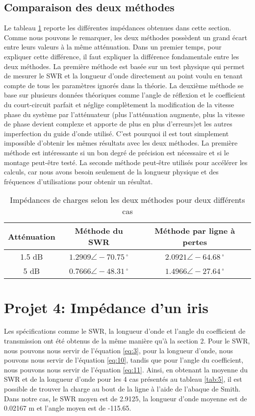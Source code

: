 \subsection{Comparaison des deux méthodes}
Le tableau \ref{tab:4} reporte les différentes impédances obtenues dans cette section. Comme nous pouvons le remarquer, les deux méthodes possèdent un grand écart entre leurs valeurs à la même atténuation. Dans un premier temps, pour expliquer cette différence, il faut expliquer la différence fondamentale entre les deux méthodes. La première méthode est basée sur un test physique qui permet de mesurer le SWR et la longueur d'onde directement au point voulu en tenant compte de tous les paramètres ignorés dans la théorie. La deuxième méthode se base sur plusieurs données théoriques comme l'angle de réflexion et le coefficient du court-circuit parfait et néglige complètement la modification de la vitesse phase du système par l'atténuateur (plus l'atténuation augmente, plus la vitesse de phase devient complexe et apporte de plus en plus d'erreurs)et les autres imperfection du guide d'onde utilisé. C'est pourquoi il est tout simplement impossible d'obtenir les mêmes résultats avec les deux méthodes. La première méthode est intéressante si un bon degré de précision est nécessaire et si le montage peut-être testé. La seconde méthode peut-être utilisés pour accélérer les calculs, car nous avons besoin seulement de la longueur physique et des fréquences d'utilisations pour obtenir un résultat.

  \begin{table}[htbp]
    \centering
    \begin{tabular}{|c||c|c|} \hline
    Atténuation & Méthode du SWR & Méthode par ligne à pertes \\ \hline  \hline
    1.5 dB & $1.2909 \angle -70.75\,^{\circ}$ & $2.0921 \angle -64.68\,^{\circ}$ \\
    5 dB   & $0.7666 \angle -48.31\,^{\circ}$ & $1.4966 \angle -27.64\,^{\circ}$ \\ \hline
    \end{tabular}%
        \caption{Impédances de charges selon les deux méthodes pour deux différents cas}
    \label{tab:4}%
\end{table}%

\section{Projet 4: Impédance d'un iris}
Les spécifications comme le SWR, la longueur d'onde et l'angle du coefficient de transmission ont été obtenus de la même manière qu'à la section 2. Pour le SWR, nous pouvons nous servir de l'équation \ref{eq:3}, pour la longueur d'onde, nous pouvons nous servir de l'équation \ref{eq:10}, tandis que pour l'angle du coefficient, nous pouvons nous servir de l'équation \ref{eq:11}. Ainsi, en obtenant la moyenne du SWR et de la longueur d'onde pour les 4 cas présentés au tableau \ref{tab:5}, il est possible de trouver la charge au bout de la ligne à l'aide de l'abaque de Smith. Dans notre cas, le SWR moyen est de 2.9125, la longueur d'onde moyenne est de 0.02167 m et l'angle moyen est de -115.65.

